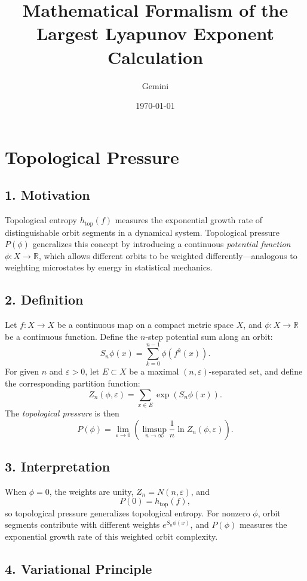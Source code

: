 \documentclass{article}
\title{Mathematical Formalism of the Largest Lyapunov Exponent Calculation}
\author{Gemini}
\date{\today}
\begin{document}
\section*{Topological Pressure}

\subsection*{1. Motivation}

Topological entropy \( h_{\text{top}}(f) \) measures the exponential growth rate of distinguishable orbit segments in a dynamical system.  
Topological pressure \( P(\phi) \) generalizes this concept by introducing a continuous \emph{potential function} \( \phi : X \to \mathbb{R} \), 
which allows different orbits to be weighted differently—analogous to weighting microstates by energy in statistical mechanics.

\subsection*{2. Definition}

Let \( f : X \to X \) be a continuous map on a compact metric space \( X \), 
and \( \phi : X \to \mathbb{R} \) be a continuous function.  
Define the $n$-step potential sum along an orbit:
\[
S_n \phi(x) = \sum_{k=0}^{n-1} \phi(f^k(x)).
\]
For given \( n \) and \( \varepsilon > 0 \), let \( E \subset X \) be a maximal \((n,\varepsilon)\)-separated set, 
and define the corresponding partition function:
\[
Z_n(\phi, \varepsilon) = \sum_{x \in E} \exp(S_n \phi(x)).
\]
The \emph{topological pressure} is then
\[
P(\phi) = \lim_{\varepsilon \to 0} 
\left( \limsup_{n \to \infty} 
\frac{1}{n} \ln Z_n(\phi, \varepsilon) \right).
\]

\subsection*{3. Interpretation}

When \( \phi = 0 \), the weights are unity, \( Z_n = N(n,\varepsilon) \), and
\[
P(0) = h_{\text{top}}(f),
\]
so topological pressure generalizes topological entropy.
For nonzero \( \phi \), orbit segments contribute with different weights \( e^{S_n \phi(x)} \),
and \( P(\phi) \) measures the exponential growth rate of this weighted orbit complexity.

\subsection*{4. Variational Principle}
\end{document}

